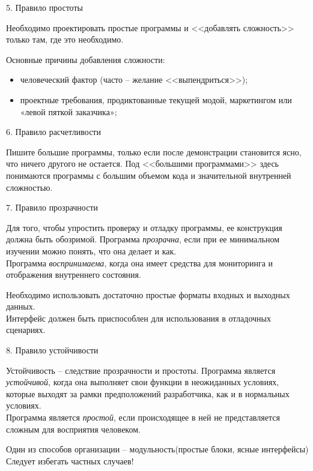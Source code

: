 \begin{frame}{5. Правило простоты}
	\begin{block}{Необходимо проектировать простые программы и <<добавлять сложность>> только там,  где это необходимо.}
	\end{block}
	\pause
	Основные причины добавления сложности:
	\begin{itemize}
		\item человеческий фактор (часто -- желание <<выпендриться>>);
		\item проектные требования,  продиктованные текущей модой,  маркетингом или «левой пяткой заказчика»;
	\end{itemize}
\end{frame}

\begin{frame}{6. Правило расчетливости}
	\begin{block}{Пишите большие программы,  только если после демонстрации становится ясно,  что ничего другого не остается.}
		Под <<большими программами>> здесь понимаются программы с большим объемом кода и значительной внутренней сложностью.
	\end{block}
\end{frame}

\begin{frame}{7. Правило прозрачности}
	\begin{block}{Для того,  чтобы упростить проверку и отладку программы,  ее конструкция должна быть обозримой.}
		\pause
		Программа {\itshape прозрачна}, если при ее минимальном изучении можно понять, что она делает и как.\\
		\pause
		Программа {\itshape воспринимаема},  когда она имеет средства для мониторинга и отображения внутреннего состояния.
	\end{block}
	\pause
	Необходимо использовать достаточно простые форматы входных и выходных данных.\\
	Интерфейс должен быть приспособлен для использования в отладочных сценариях.
\end{frame}

\begin{frame}{8. Правило устойчивости}
	\begin{block}{Устойчивость -- следствие	прозрачности и простоты.}
		\pause
		Программа является {\itshape устойчивой},  когда она выполняет свои функции в неожиданных условиях,  которые выходят за рамки предположений разработчика,  как и в нормальных условиях.\\
		\pause
		Программа является {\itshape простой},  если происходящее в ней не представляется сложным для восприятия человеком.
	\end{block}
	\pause
	Один из способов организации -- модульность(простые блоки,  ясные интерфейсы)\\
	Следует избегать частных случаев!
\end{frame}

